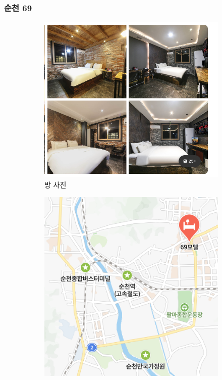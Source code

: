 \documentclass[10pt]{article}
\begin{document}
\subsubsection{순천 69}
\begin{figure}[htbp]
  \centering
  \begin{subfigure}{0.3\textwidth}
    \centering
    \includegraphics[width=\linewidth]{fig/7_방.png}
    \caption{방 사진}
    \label{fig:1}
  \end{subfigure}
  \hfill
  \begin{subfigure}{0.3\textwidth}
    \centering
    \includegraphics[width=\linewidth]{fig/7_위치.png}

\end{subfigure}
\end{figure}
\end{document}
